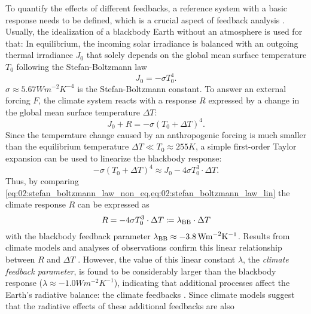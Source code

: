 To quantify the effects of different feedbacks, a reference system with a basic
response needs to be defined, which is a crucial aspect of feedback analysis
\autocite{Roe2009}. Usually, the idealization of a blackbody Earth without an
atmosphere is used for that: In equilibrium, the incoming solar irradiance is
balanced with an outgoing thermal irradiance $J_0$ that solely depends on the
global mean surface temperature $T_0$ following the Stefan-Boltzmann law
\begin{equation}
  J_0 = -\sigma T_0^4.
  \label{eq:02:stefan_boltzmann_law_eq}
\end{equation}
$\sigma \approx 5.67 \unit{W m^{-2} K^{-4}}$ is the Stefan-Boltzmann constant.
To answer an external forcing $F$, the climate system reacts with a response
$R$ expressed by a change in the global mean surface temperature $\Delta T$:
\begin{equation}
  J_0 + R = -\sigma \left( T_0 + \Delta T \right)^4.
  \label{eq:02:stefan_boltzmann_law_non_eq}
\end{equation}
Since the temperature change caused by an anthropogenic forcing is much smaller
than the equilibrium temperature $\Delta T \ll T_0 \approx 255 \unit{K}$, a
simple first-order Taylor expansion can be used to linearize the blackbody
response:
\begin{equation}
  -\sigma \left( T_0 + \Delta T \right)^4 \approx J_0 - 4 \sigma T_0^3 \cdot
  \Delta T.
  \label{eq:02:stefan_boltzmann_law_lin}
\end{equation}
Thus, by comparing
\cref{eq:02:stefan_boltzmann_law_non_eq,eq:02:stefan_boltzmann_law_lin} the
climate response $R$ can be expressed as
\begin{equation}
  R = -4 \sigma T_0^3 \cdot \Delta T \coloneq \lambda_\mathtxt{BB} \cdot
  \Delta T
  \label{eq:02:linear_blackbody_response}
\end{equation}
with the blackbody feedback parameter $\lambda_\mathtxt{BB} \approx -3.8
\unit{W m^{-2} K^{-1}}$. Results from climate models and analyses of
observations confirm this linear relationship between $R$ and $\Delta T$
\autocite{Gregory2004}. However, the value of this linear constant $\lambda$,
the \emph{climate feedback parameter}, is found to be considerably larger than
the blackbody response ($\lambda \approx -1.0 \unit{W m^{-2} K^{-1}}$),
indicating that additional processes affect the Earth's radiative balance: the
climate feedbacks \autocite{Flato2013, Gregory2009}. Since climate models
suggest that the radiative effects of these additional feedbacks are also
